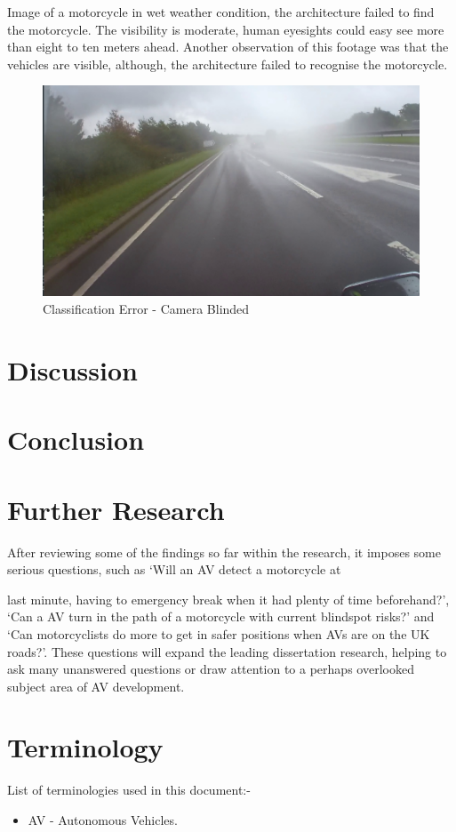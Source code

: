 \documentclass[conference]{IEEEtran}
\begin{document}
	Image of a motorcycle in wet weather condition, the architecture failed to find the motorcycle. The visibility is moderate, human eyesights could easy see more than eight to ten meters ahead. Another observation of this footage was that the vehicles are visible, although, the architecture failed to recognise the motorcycle.
	\begin{figure}[htp]
        \centering
        \includegraphics[width=\columnwidth]{Figures/wet_danger.png}
        \caption{Classification Error - Camera Blinded}
        \label{fig:detectionOfMotorcycleW3}
    \end{figure}

\section{Discussion}
	
\section{Conclusion}

\section{Further Research}
	After reviewing some of the findings so far within the research, it imposes some serious questions, such as `Will an AV detect a motorcycle at
	
	last minute, having to emergency break when it had plenty of time beforehand?', `Can a AV turn in the path of a motorcycle with current blindspot risks?' and `Can motorcyclists do more to get in safer positions when AVs are on the UK roads?'. These questions will expand the leading dissertation research, helping to ask many unanswered questions or draw attention to a perhaps overlooked subject area of AV development.

\section{Terminology}
	List of terminologies used in this document:-
	\begin{itemize}
		\item AV - Autonomous Vehicles.
	\end{itemize}

\renewcommand\refname{\section{Reference List}}
\small{
	}
\end{document}
